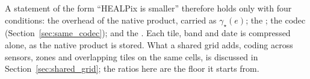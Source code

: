 A statement of the form ``HEALPix is smaller'' therefore holds only
with four conditions: the overhead of the native product, carried as
$\gamma_\star(e)$; the ; the codec
(Section~\ref{sec:same_codec}); and the .
Each tile, band and date is compressed alone, as the native product is
stored. What a shared grid adds, coding across sensors, zones and overlapping
tiles on the same cells, is discussed in Section~\ref{sec:shared_grid}; the
ratios here are the floor it starts from.
